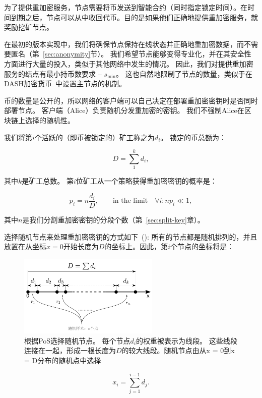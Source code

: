 \documentclass[longbibliography,nofootinbib]{revtex4-1}
\begin{document}
为了提供重加密服务，节点需要将币发送到智能合约（同时指定锁定时间）。在时间到期之后，节点可以从中收回代币。目的是如果他们正确地提供重加密服务，就奖励挖矿节点。

    在最初的版本实现中，我们将确保节点保持在线状态并正确地重加密数据，而不需要匿名（第~\ref{sec:anonymity}节）。 我们希望节点能够变得专业化，并在其安全性方面进行大量的投入，类似于其他网络中发生的情况。 因此，我们对提供重加密服务的结点有最小持币数要求 – $s_{\min}$。 这也自然地限制了节点的数量，类似于在DASH加密货币~\cite{dash:whitepaper}中设置主节点的机制。
    
    币的数量是公开的，所以网络的客户端可以自己决定在部署重加密密钥时是否同时部署节点。 客户端（Alice）负责随机分发重加密的密钥。 我们不强制Alice在区块链上选择的随机性。
    
    我们将第$i$个活跃的（即币被锁定的）矿工称之为$d_i$。 锁定的币总额为：

\begin{equation}
    D = \sum_1^k d_i,
\end{equation}

其中$k$是矿工总数。 第$i$位矿工从一个策略获得重加密密钥的概率是：

\begin{equation}
    p_i = n\frac{d_i}{D},\qquad\text{in the limit}\quad \forall i: n p_i \ll 1,
\end{equation}

        其中$n$是我们分割重加密密钥的分段个数（第~\ref{sec:split-key}章）。

    选择随机节点来处理重加密密钥的方式如下~(): 所有的节点都是随机排列的，并且放置在从坐标$x=0$开始长度为$D$的坐标上。因此，第$i$个节点的坐标将是：
    
\begin{figure}
    \centering
    \includegraphics[width=0.6\textwidth]{pdf/miners-ruler.pdf}
    \caption{根据PoS选择随机节点。 每个节点$d_i$的权重被表示为线段。 这些线段连接在一起，形成一根长度为$D$的较大线段。随机节点由从x = 0到x = D分布的随机点中选择}
    \label{fig:random-nodes}
\end{figure}
\begin{equation}
    x_i = \sum_{j=1}^{i-1} d_j.
\end{equation}
\end{document}
